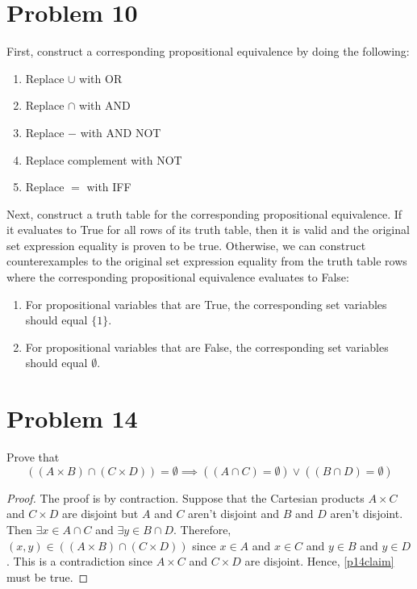 \documentclass{article}
\begin{document}
\section{Problem 10}
First, construct a corresponding propositional equivalence by doing the following:
\begin{enumerate}
	\item Replace $\cup$ with OR
	\item Replace $\cap$ with AND
	\item Replace $-$ with AND NOT
	\item Replace complement with NOT
	\item Replace $=$ with IFF
\end{enumerate}
Next, construct a truth table for the corresponding propositional equivalence. If it evaluates to True for all rows of its truth table, then it is valid and the original set expression equality is proven to be true. Otherwise, we can construct counterexamples to the original set expression equality from the truth table rows where the corresponding propositional equivalence evaluates to False:
\begin{enumerate}
	\item For propositional variables that are True, the corresponding set variables should equal $\{1\}$.
	\item For propositional variables that are False, the corresponding set variables should equal $\emptyset$.
\end{enumerate}

\pagebreak

\section{Problem 14}
Prove that
\begin{equation}\label{p14claim}
	((A \times B) \cap (C \times D)) = \emptyset \implies ((A \cap C) = \emptyset) \lor ((B \cap D) = \emptyset)
\end{equation}
\begin{proof}
	The proof is by contraction. Suppose that the Cartesian products $A \times C$ and $C \times D$ are disjoint but $A$ and $C$ aren't disjoint and $B$ and $D$ aren't disjoint. Then $\exists x \in A \cap C$ and $\exists y \in B \cap D$. Therefore, $(x, y) \in ((A \times B) \cap (C \times D))$ since $x \in A$ and $x \in C$ and $y \in B$ and $y \in D$. This is a contradiction since $A \times C$ and $C \times D$ are disjoint. Hence, \eqref{p14claim} must be true.
\end{proof}
\end{document}
